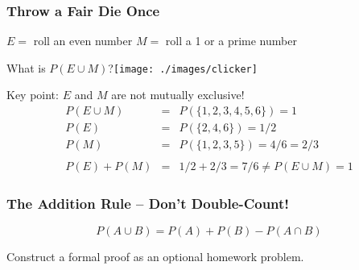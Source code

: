 \begin{frame}
\frametitle{Throw a Fair Die Once}
\begin{block}{$E = $ roll an even number \hfill $M = $ roll a 1 or a prime number}
\end{block}
\begin{alertblock}{What is $P(E\cup M)$?\hfill \texttt{[image: ./images/clicker]} }\end{alertblock}
\pause
Key point: $E$ and $M$ are not mutually exclusive! 
	\begin{eqnarray*}
		P(E\cup M) &=& P(\{1,2,3,4,5,6\})= 1\\ 
		P(E) &=& P(\{2,4,6\}) = 1/2\\ 
		P(M) &=& P(\{1,2,3,5\}) = 4/6 = 2/3\\ \\
		P(E) + P(M) &=& 1/2 + 2/3 = 7/6 \neq P(E\cup M) = 1
	\end{eqnarray*}

\end{frame}


\begin{frame}
\frametitle{The Addition Rule -- Don't Double-Count!}
$$P(A\cup B) = P(A) + P(B) - P(A\cap B)$$
\begin{figure}
\centering
{}
\end{figure}
\alert{Construct a formal proof as an optional homework problem.}
\end{frame}
